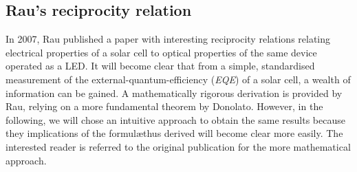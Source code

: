 \documentclass[a4paper]{article}
\begin{document}
\subsection{Rau's reciprocity relation}
In 2007, Rau published a paper with interesting reciprocity relations relating electrical properties of a solar cell to optical properties of the same device operated as a LED. It will become clear that from a simple, standardised measurement of the external-quantum-efficiency (\emph{EQE}) of a solar cell, a wealth of information can be gained. A mathematically rigorous derivation is provided by Rau, relying on a more fundamental theorem by Donolato. However, in the following, we will chose an intuitive approach to obtain the same results because they implications of the formul\ae thus derived will become clear more easily. The interested reader is referred to the original publication for the more mathematical approach.\\
\end{document}
